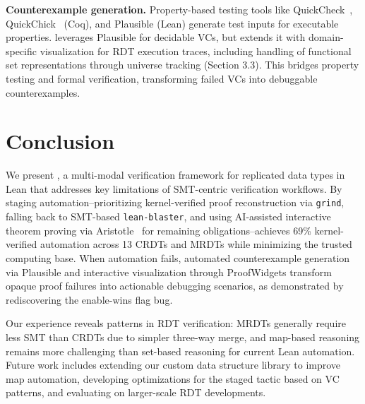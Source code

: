 \documentclass[sigplan,twocolumn,accept]{acmart}
\begin{document}
\textbf{Counterexample generation.} Property-based testing tools like QuickCheck~\cite{quickcheck_paper}, QuickChick~\cite{quickchick} (Coq), and Plausible (Lean) generate test inputs for executable properties. \sal leverages Plausible for decidable VCs, but extends it with domain-specific visualization for RDT execution traces, including handling of functional set representations through universe tracking (Section 3.3). This bridges property testing and formal verification, transforming failed VCs into debuggable counterexamples.

\section{Conclusion}

We present \sal, a multi-modal verification framework for replicated data types in Lean that addresses key limitations of SMT-centric verification workflows. By staging automation--prioritizing kernel-verified proof reconstruction via \texttt{grind}, falling back to SMT-based \texttt{lean-blaster}, and using AI-assisted interactive theorem proving via Aristotle~\cite{achim2025aristotleimolevelautomatedtheorem} for remaining obligations--\sal achieves 69\% kernel-verified automation across 13 CRDTs and MRDTs while minimizing the trusted computing base. When automation fails, automated counterexample generation via Plausible and interactive visualization through ProofWidgets transform opaque proof failures into actionable debugging scenarios, as demonstrated by rediscovering the enable-wins flag bug.

Our experience reveals patterns in RDT verification: MRDTs generally require less SMT than CRDTs due to simpler three-way merge, and map-based reasoning remains more challenging than set-based reasoning for current Lean automation. Future work includes extending our custom data structure library to improve map automation, developing optimizations for the staged tactic based on VC patterns, and evaluating \sal on larger-scale RDT developments.








\appendix
\end{document}
